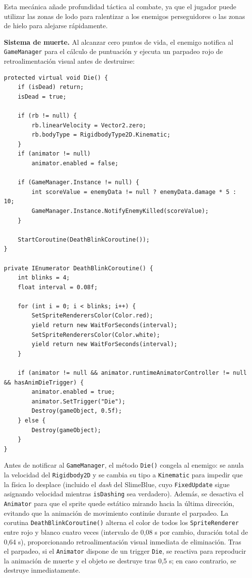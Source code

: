 Esta mecánica añade profundidad táctica al combate, ya que el jugador puede utilizar las zonas de lodo para ralentizar a los enemigos perseguidores o las zonas de hielo para alejarse rápidamente.

\textbf{Sistema de muerte.} Al alcanzar cero puntos de vida, el enemigo notifica al \texttt{GameManager} para el cálculo de puntuación y ejecuta un parpadeo rojo de retroalimentación visual antes de destruirse:

\begin{lstlisting}
protected virtual void Die() {
    if (isDead) return;
    isDead = true;

    if (rb != null) {
        rb.linearVelocity = Vector2.zero;
        rb.bodyType = RigidbodyType2D.Kinematic;
    }
    if (animator != null)
        animator.enabled = false;
    
    if (GameManager.Instance != null) {
        int scoreValue = enemyData != null ? enemyData.damage * 5 : 10;
        GameManager.Instance.NotifyEnemyKilled(scoreValue);
    }

    StartCoroutine(DeathBlinkCoroutine());
}

private IEnumerator DeathBlinkCoroutine() {
    int blinks = 4;
    float interval = 0.08f;

    for (int i = 0; i < blinks; i++) {
        SetSpriteRenderersColor(Color.red);
        yield return new WaitForSeconds(interval);
        SetSpriteRenderersColor(Color.white);
        yield return new WaitForSeconds(interval);
    }

    if (animator != null && animator.runtimeAnimatorController != null && hasAnimDieTrigger) {
        animator.enabled = true;
        animator.SetTrigger("Die");
        Destroy(gameObject, 0.5f);
    } else {
        Destroy(gameObject);
    }
}
\end{lstlisting}


Antes de notificar al \texttt{GameManager}, el método \texttt{Die()} congela al enemigo: se anula la velocidad del \texttt{Rigidbody2D} y se cambia su tipo a \texttt{Kinematic} para impedir que la física lo desplace (incluido el \textit{dash} del SlimeBlue, cuyo \texttt{FixedUpdate} sigue asignando velocidad mientras \texttt{isDashing} sea verdadero). Además, se desactiva el \texttt{Animator} para que el sprite quede estático mirando hacia la última dirección, evitando que la animación de movimiento continúe durante el parpadeo. La corutina \texttt{DeathBlinkCoroutine()} alterna el color de todos los \texttt{SpriteRenderer} entre rojo y blanco cuatro veces (intervalo de 0,08 s por cambio, duración total de 0,64 s), proporcionando retroalimentación visual inmediata de eliminación. Tras el parpadeo, si el \texttt{Animator} dispone de un trigger \texttt{Die}, se reactiva para reproducir la animación de muerte y el objeto se destruye tras 0,5 s; en caso contrario, se destruye inmediatamente.

